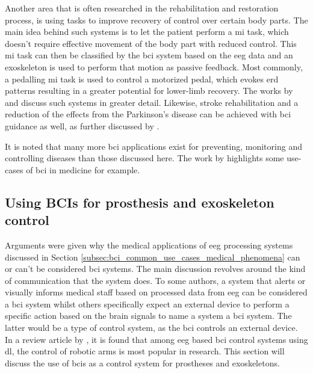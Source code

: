 Another area that is often researched in the rehabilitation and restoration process, is using  tasks to improve recovery of control over certain body parts.
The main idea behind such systems is to let the patient perform a \gls{mi} task, which doesn't require effective movement of the body part with reduced control.
This \gls{mi} task can then be classified by the \gls{bci} system based on the \gls{eeg} data and an exoskeleton is used to perform that motion as passive feedback.
Most commonly, a pedalling \gls{mi} task is used to control a motorized pedal, which evokes \gls{erd} patterns resulting in a greater potential for lower-limb recovery.
The works by \citet{pedal_mi_rehabilitation1} and \citet{pedal_mi_rehabilitation2} discuss such systems in greater detail.
Likewise, stroke rehabilitation and a reduction of the effects from the Parkinson's disease can be achieved with \gls{bci} guidance as well, as further discussed by \citet{parkinson_stroke_reduction}.

It is noted that many more \gls{bci} applications exist for preventing, monitoring and controlling diseases than those discussed here.
The work by \citet{bci_in_medicine} highlights some use-cases of \gls{bci} in medicine for example.


\subsection{Using BCIs for prosthesis and exoskeleton control}
\label{subsec:bci_common_use_cases_prosthesis_exoskeleton}

Arguments were given why the medical applications of \gls{eeg} processing systems discussed in Section \ref{subsec:bci_common_use_cases_medical_phenomena} can or can't be considered \gls{bci} systems.
The main discussion revolves around the kind of communication that the system does.
To some authors, a system that alerts or visually informs medical staff based on processed data from \gls{eeg} can be considered a \gls{bci} system whilst others specifically expect an external device to perform a specific action based on the brain signals to name a system a \gls{bci} system.
The latter would be a type of control system, as the \gls{bci} controls an external device.
In a review article by \citet{bci_review_arnau}, it is found that among \gls{eeg} based \gls{bci} control systems using \gls{dl}, the control of robotic arms is most popular in research.
This section will discuss the use of \glspl{bci} as a control system for prostheses and exoskeletons.

